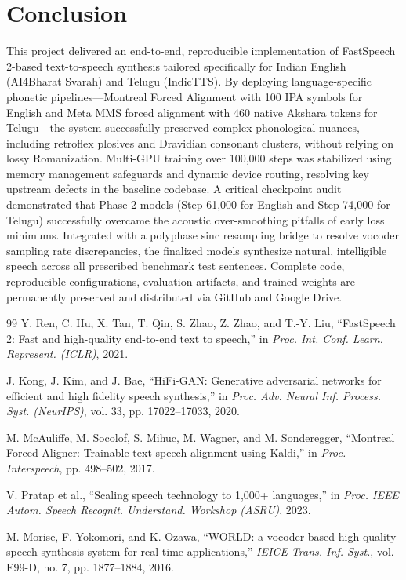 \documentclass[11pt,a4paper]{article}
\begin{document}
\section{Conclusion}
This project delivered an end-to-end, reproducible implementation of FastSpeech 2-based text-to-speech synthesis tailored specifically for Indian English (AI4Bharat Svarah) and Telugu (IndicTTS). By deploying language-specific phonetic pipelines---Montreal Forced Alignment with 100 IPA symbols for English and Meta MMS forced alignment with 460 native Akshara tokens for Telugu---the system successfully preserved complex phonological nuances, including retroflex plosives and Dravidian consonant clusters, without relying on lossy Romanization. Multi-GPU training over 100,000 steps was stabilized using memory management safeguards and dynamic device routing, resolving key upstream defects in the baseline codebase. A critical checkpoint audit demonstrated that Phase 2 models (Step 61,000 for English and Step 74,000 for Telugu) successfully overcame the acoustic over-smoothing pitfalls of early loss minimums. Integrated with a polyphase sinc resampling bridge to resolve vocoder sampling rate discrepancies, the finalized models synthesize natural, intelligible speech across all prescribed benchmark test sentences. Complete code, reproducible configurations, evaluation artifacts, and trained weights are permanently preserved and distributed via GitHub and Google Drive.

\begin{thebibliography}{99}
Y. Ren, C. Hu, X. Tan, T. Qin, S. Zhao, Z. Zhao, and T.-Y. Liu, ``FastSpeech 2: Fast and high-quality end-to-end text to speech,'' in \textit{Proc. Int. Conf. Learn. Represent. (ICLR)}, 2021.

J. Kong, J. Kim, and J. Bae, ``HiFi-GAN: Generative adversarial networks for efficient and high fidelity speech synthesis,'' in \textit{Proc. Adv. Neural Inf. Process. Syst. (NeurIPS)}, vol. 33, pp. 17022--17033, 2020.

M. McAuliffe, M. Socolof, S. Mihuc, M. Wagner, and M. Sonderegger, ``Montreal Forced Aligner: Trainable text-speech alignment using Kaldi,'' in \textit{Proc. Interspeech}, pp. 498--502, 2017.

V. Pratap et al., ``Scaling speech technology to 1,000+ languages,'' in \textit{Proc. IEEE Autom. Speech Recognit. Understand. Workshop (ASRU)}, 2023.

M. Morise, F. Yokomori, and K. Ozawa, ``WORLD: a vocoder-based high-quality speech synthesis system for real-time applications,'' \textit{IEICE Trans. Inf. Syst.}, vol. E99-D, no. 7, pp. 1877--1884, 2016.
\end{thebibliography}
\end{document}
